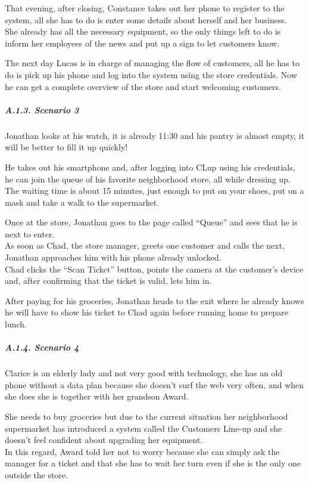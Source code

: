 That evening, after closing, Constance takes out her phone to register
to the system, all she has to do is enter some details about herself and
her business.\\
She already has all the necessary equipment, so the only things left to
do is inform her employees of the news and put up a sign to let
customers know.

The next day Lucas is in charge of managing the flow of customers, all
he has to do is pick up his phone and log into the system using the
store credentials. Now he can get a complete overview of the store and
start welcoming customers.

\hypertarget{a.1.3.-scenario-3}{%
\subparagraph{\texorpdfstring{A.1.3. Scenario 3
}{A.1.3. Scenario 3 }}\label{a.1.3.-scenario-3}}

Jonathan looks at his watch, it is already 11:30 and his pantry is
almost empty, it will be better to fill it up quickly!

He takes out his smartphone and, after logging into CLup using his
credentials, he can join the queue of his favorite neighborhood store,
all while dressing up.\\
The waiting time is about 15 minutes, just enough to put on your shoes,
put on a mask and take a walk to the supermarket.

Once at the store, Jonathan goes to the page called ``Queue'' and sees
that he is next to enter.\\
As soon as Chad, the store manager, greets one customer and calls the
next, Jonathan approaches him with his phone already unlocked.\\
Chad clicks the ``Scan Ticket'' button, points the camera at the
customer's device and, after confirming that the ticket is valid, lets
him in.

After paying for his groceries, Jonathan heads to the exit where he
already knows he will have to show his ticket to Chad again before
running home to prepare lunch.

\hypertarget{a.1.4.-scenario-4}{%
\subparagraph{\texorpdfstring{A.1.4. Scenario 4
}{A.1.4. Scenario 4 }}\label{a.1.4.-scenario-4}}

Clarice is an elderly lady and not very good with technology, she has an
old phone without a data plan because she doesn't surf the web very
often, and when she does she is together with her grandson Award.

She needs to buy groceries but due to the current situation her
neighborhood supermarket has introduced a system called the Customers
Line-up and she doesn't feel confident about upgrading her equipment.\\
In this regard, Award told her not to worry because she can simply ask
the manager for a ticket and that she has to wait her turn even if she
is the only one outside the store.

